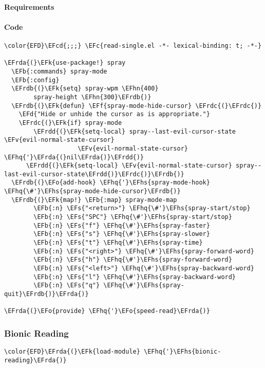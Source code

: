 \documentclass[a4wide,10pt]{article}
\newcommand{\EFc}[1]{\textcolor{EFc}{#1}} %
\newcommand{\EFcd}[1]{\textcolor{EFcd}{#1}} %
\newcommand{\EFs}[1]{\textcolor{EFs}{#1}} %
\newcommand{\EFd}[1]{\textcolor{EFd}{#1}} %
\newcommand{\EFk}[1]{\textcolor{EFk}{#1}} %
\newcommand{\EFb}[1]{\textcolor{EFb}{#1}} %
\newcommand{\EFf}[1]{\textcolor{EFf}{#1}} %
\newcommand{\EFv}[1]{\textcolor{EFv}{#1}} %
\newcommand{\EFo}[1]{\textcolor{EFo}{#1}} %
\newcommand{\EFhn}[1]{\textcolor{EFhn}{\textbf{#1}}} %
\newcommand{\EFhq}[1]{\textcolor{EFhq}{#1}} %
\newcommand{\EFhs}[1]{\textcolor{EFhs}{#1}} %
\newcommand{\EFrda}[1]{\textcolor{EFrda}{#1}} %
\newcommand{\EFrdb}[1]{\textcolor{EFrdb}{#1}} %
\newcommand{\EFrdc}[1]{\textcolor{EFrdc}{#1}} %
\newcommand{\EFrdd}[1]{\textcolor{EFrdd}{#1}} %
\begin{document}
\paragraph{Requirements}
\label{sec:orge95711d}
\paragraph{Code}
\label{sec:org52cb0b9}
\begin{Code}
\begin{Verbatim}
\color{EFD}\EFcd{;;;} \EFc{read-single.el -*- lexical-binding: t; -*-}

\EFrda{(}\EFk{use-package!} spray
  \EFb{:commands} spray-mode
  \EFb{:config}
  \EFrdb{(}\EFk{setq} spray-wpm \EFhn{400}
        spray-height \EFhn{300}\EFrdb{)}
  \EFrdb{(}\EFk{defun} \EFf{spray-mode-hide-cursor} \EFrdc{(}\EFrdc{)}
    \EFd{"Hide or unhide the cursor as is appropriate."}
    \EFrdc{(}\EFk{if} spray-mode
        \EFrdd{(}\EFk{setq-local} spray--last-evil-cursor-state \EFv{evil-normal-state-cursor}
                    \EFv{evil-normal-state-cursor} \EFhq{'}\EFrda{(}nil\EFrda{)}\EFrdd{)}
      \EFrdd{(}\EFk{setq-local} \EFv{evil-normal-state-cursor} spray--last-evil-cursor-state\EFrdd{)}\EFrdc{)}\EFrdb{)}
  \EFrdb{(}\EFo{add-hook} \EFhq{'}\EFhs{spray-mode-hook} \EFhq{\#'}\EFhs{spray-mode-hide-cursor}\EFrdb{)}
  \EFrdb{(}\EFk{map!} \EFb{:map} spray-mode-map
        \EFb{:n} \EFs{"<return>"} \EFhq{\#'}\EFhs{spray-start/stop}
        \EFb{:n} \EFs{"SPC"} \EFhq{\#'}\EFhs{spray-start/stop}
        \EFb{:n} \EFs{"f"} \EFhq{\#'}\EFhs{spray-faster}
        \EFb{:n} \EFs{"s"} \EFhq{\#'}\EFhs{spray-slower}
        \EFb{:n} \EFs{"t"} \EFhq{\#'}\EFhs{spray-time}
        \EFb{:n} \EFs{"<right>"} \EFhq{\#'}\EFhs{spray-forward-word}
        \EFb{:n} \EFs{"h"} \EFhq{\#'}\EFhs{spray-forward-word}
        \EFb{:n} \EFs{"<left>"} \EFhq{\#'}\EFhs{spray-backward-word}
        \EFb{:n} \EFs{"l"} \EFhq{\#'}\EFhs{spray-backward-word}
        \EFb{:n} \EFs{"q"} \EFhq{\#'}\EFhs{spray-quit}\EFrdb{)}\EFrda{)}

\EFrda{(}\EFo{provide} \EFhq{'}\EFo{speed-read}\EFrda{)}
\end{Verbatim}
\end{Code}
\subsubsection{Bionic Reading}
\label{sec:org18565b1}
\begin{Code}
\begin{Verbatim}
\color{EFD}\EFrda{(}\EFk{load-module} \EFhq{'}\EFhs{bionic-reading}\EFrda{)}
\end{Verbatim}
\end{Code}
\end{document}
